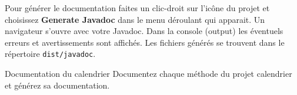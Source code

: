 \documentclass[a4paper,11pt]{style-esi/td}
\begin{document}
	Pour générer le documentation faites un clic-droit sur l'icône du projet et choisissez 
	\textbf{Generate Javadoc} dans le menu déroulant qui apparait. 
	Un navigateur s'ouvre avec votre Javadoc. Dans la console (output) les éventuels 
	erreurs et avertissements sont affichés.
	Les fichiers générés se trouvent dans le répertoire \texttt{dist/javadoc}.
	

	\begin{Exercice}{Documentation du calendrier}
		Documentez chaque méthode du projet calendrier et générez sa documentation.
	\end{Exercice}

	
				
\end{document}
